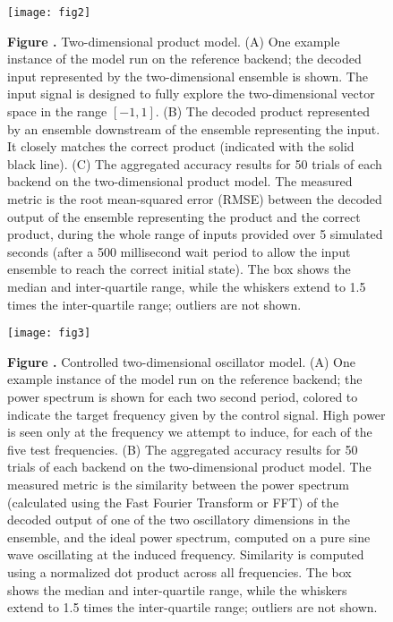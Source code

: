 \documentclass{frontiersSCNS}
\begin{document}
\begin{figure}[!ht]
\begin{center}
  \texttt{[image: fig2]}
\end{center}
\textbf{\label{fig:02} Figure .}
       {Two-dimensional product model. (A) One example instance of the model
         run on the reference backend; the decoded input represented
         by the two-dimensional ensemble is shown. The input signal is
         designed to fully explore the two-dimensional vector space
         in the range $[-1, 1]$.
         (B) The decoded product represented by an ensemble downstream
         of the ensemble representing the input. It closely matches the
         correct product (indicated with the solid black line).
         (C) The aggregated accuracy results for 50 trials of
         each backend on the
         two-dimensional product model. The measured metric is the root
         mean-squared error (RMSE) between the decoded output of the ensemble
         representing the product and the correct product, during the whole
         range of inputs provided over 5 simulated seconds (after a 500
         millisecond wait period to allow the input ensemble to reach the
         correct initial state). The box shows the median and
         inter-quartile range, while the whiskers extend to 1.5 times the
         inter-quartile range; outliers are not shown.}
\end{figure}

\begin{figure}[!ht]
\begin{center}
  \texttt{[image: fig3]}
\end{center}
\textbf{\label{fig:03} Figure .}
       {Controlled two-dimensional oscillator model. (A) One example
         instance of the model run on the reference backend;
         the power spectrum is shown for each two second period,
         colored to indicate the target frequency given by the control signal.
         High power is seen only at the frequency we attempt to induce,
         for each of the five test frequencies.
         (B) The aggregated accuracy results for 50 trials of
         each backend on the
         two-dimensional product model. The measured metric is the similarity
         between the power spectrum (calculated using the Fast Fourier
         Transform or FFT) of the decoded output of one of the two oscillatory
         dimensions in the ensemble, and the ideal power spectrum,
         computed on a pure sine wave oscillating at the induced frequency.
         Similarity is computed using a normalized dot product across
         all frequencies. The box shows the median and
         inter-quartile range, while the whiskers extend to 1.5 times the
         inter-quartile range; outliers are not shown.}
\end{figure}
\end{document}
